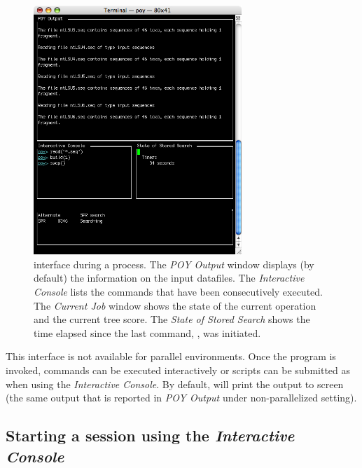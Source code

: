\begin{figure}[htbp]
   \centering
   \includegraphics[width=0.7\textwidth]{figures/figprocess.jpg}
   \caption{\poy interface during a process. The \emph{POY Output} window displays (by default) the information on the input datafiles. The \emph{Interactive Console} lists the commands that have been consecutively executed. The \emph{Current Job} window shows the state of the current operation and the current tree score. The \emph{State of Stored Search} shows the time elapsed  since the last command, , was initiated.}
   \label{fig:figprocess}
\end{figure}

This \poy interface is not available for parallel environments. Once the program is invoked, \poy commands can be executed interactively or scripts can be submitted as when using the \emph{Interactive Console}. By default, \poy will print the output to screen (the same output that is reported in \emph{POY Output} under non-parallelized setting).

\subsection{Starting a \poy session using the \emph{Interactive Console}}


